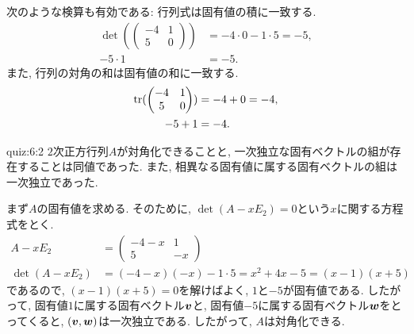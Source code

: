 \begin{checkanswer}%
  次のような検算も有効である:
 行列式は固有値の積に一致する.
 \begin{align*}
  \det(\begin{pmatrix}
      -4&1\\5&0
  \end{pmatrix})&=-4\cdot0-1\cdot 5=-5,\\
 -5\cdot 1 &=-5.
 \end{align*}
 また, 行列の対角の和は固有値の和に一致する.
 \begin{align*}
  \operatorname{tr}(\begin{pmatrix}
      -4&1\\5&0
  \end{pmatrix})&=-4+0=-4,\\
 -5+ 1 &=-4.
 \end{align*}
\end{checkanswer}


\begin{answerof}{quiz:6:2}
  $2$次正方行列$A$が対角化できることと,
  一次独立な固有ベクトルの組が存在することは同値であった.
  また, 相異なる固有値に属する固有ベクトルの組は一次独立であった.
  
  まず$A$の固有値を求める.
  そのために, $\det(A-xE_2)=0$という$x$に関する方程式をとく.
  \begin{align*}
    A-xE_2&=\begin{pmatrix}-4-x&1\\5&-x\end{pmatrix}\\
    \det(A-xE_2)&=(-4-x)(-x)-1\cdot 5=x^2+4x-5=(x-1)(x+5)
  \end{align*}
  であるので, $(x-1)(x+5)=0$を解けばよく,
  $1$と$-5$が固有値である.
  したがって,
  固有値$1$に属する固有ベクトル$\boldsymbol{v}$と,
  固有値$-5$に属する固有ベクトル$\boldsymbol{w}$をとってくると,
  $(\boldsymbol{v},\boldsymbol{w})$は一次独立である.
  したがって, $A$は対角化できる.
\end{answerof}


